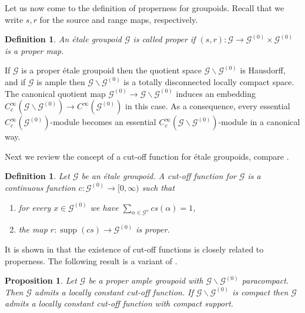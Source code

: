 \documentclass{amsart}
\newtheorem{dfn}[thm]{Definition}
\newtheorem{prop}[thm]{Proposition}
\newcommand{\G}{\mathcal{G}}
\newcommand{\ccinfty}{C_c^\infty}
\begin{document}
Let us now come to the definition of properness for groupoids. Recall that we write $ s, r $ for the source and range maps, respectively. 

\begin{dfn}
An \'etale groupoid $ \G $ is called proper if $ (s,r): \G \rightarrow \G^{(0)} \times \G^{(0)} $ is a proper map. 
\end{dfn}

If $ \G $ is a proper \'etale groupoid then the quotient space $ \G \backslash \G^{(0)} $ is Hausdorff, 
and if $ \G $ is ample then $ \G \backslash \G^{(0)} $ is a totally disconnected locally compact space. 
The canonical quotient map $ \G^{(0)} \rightarrow \G \backslash \G^{(0)} $ induces an embedding $ \ccinfty(\G\backslash \G^{(0)}) \rightarrow C^{\infty}(\G^{(0)}) $ in this case. As a consequence, every essential $ \ccinfty(\G^{(0)}) $-module becomes an essential $ \ccinfty(\G \backslash \G^{(0)}) $-module in a canonical way. 

Next we review the concept of a cut-off function for \'etale groupoids, compare \cite[Definition 6.7]{TU_novikovhyperbolique}. 

\begin{dfn}
Let $ \G $ be an \'etale groupoid. A cut-off function for $ \G $ is a continuous function $ c: \G^{(0)} \rightarrow [0, \infty) $ such that
\begin{enumerate}
\item for every $ x \in \G^{(0)} $ we have $ \sum_{\alpha \in \G^x} cs(\alpha) = 1 $,
\item the map $ r :\operatorname{supp}(cs) \rightarrow \G^{(0)} $ is proper.
\end{enumerate}
\end{dfn}

It is shown in \cite[Proposition 6.10 and Proposition 6.11]{TU_novikovhyperbolique} that the existence of cut-off functions is closely related to properness. 
The following result is a variant of \cite[Proposition 6.11]{TU_novikovhyperbolique}. 

\begin{prop} \label{smoothcutoff}
Let $ \G $ be a proper ample groupoid with $ \G \backslash \G^{(0)} $ paracompact. Then $ \G $ admits a locally constant cut-off function. If $ \G \backslash \G^{(0)} $ is compact 
then $ \G $ admits a locally constant cut-off function with compact support.
\end{prop}
\end{document}
